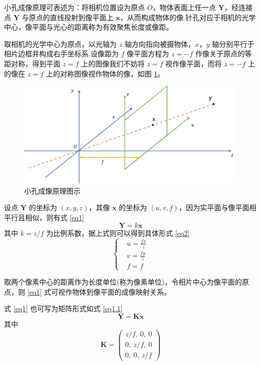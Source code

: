 \documentclass{article}
\numberwithin{equation}{section}						%
\numberwithin{figure}{section}							%
\begin{document}
\begin{sloppypar}
	小孔成像原理可表述为：将相机位置设为原点 $O$，物体表面上任一点 $\bm Y$，经连接点 $\bm Y$ 与原点的直线投射到像平面上 $\bm x$，从而构成物体的像.针孔对应于相机的光学中心，像平面与光心的距离称为有效聚焦长度或像距。
	
	取相机的光学中心为原点，以光轴为 $z$ 轴方向指向被摄物体，$x$，$y$ 轴分别平行于相片边框并构成右手坐标系.设像距为 $f$ 像平面方程为 $z=-f$ 作像关于原点的等距对称，得到平面 $z=f$ 上的图像我们不妨将 $z=f$ 视作像平面，而将 $z=-f$ 上的像在 $z=f$ 上的对称图像视作物体的像，如图 \ref{zuobiao}。
	\begin{figure}[H]
		\centering
		\includegraphics[width=0.8\linewidth]{zuobiao}
		\caption{小孔成像原理图示}
		\label{zuobiao}
	\end{figure}
	
	设点 $\bm Y$ 的坐标为 $(x,y,z)$，其像 $\bm x$ 的坐标为 $(u,v,f)$，因为实平面与像平面相平行且相似，则有式 \ref{eq1}
	\begin{equation}
		{\bm Y} = k{\bm x}
		\label{eq1}
	\end{equation}
	其中 $k = z/f$ 为比例系数，据上式则可以得到具体形式 \ref{eq2}
	\begin{equation}
		\left\lbrace
		\begin{aligned}
			&u = \frac{fx}{z} \\
			&v = \frac{fy}{z} \\
			&f = f
		\end{aligned}
		\right. 
		\label{eq2}
	\end{equation}
	
	取两个像素中心的距离作为长度单位(称为像素单位)，令相片中心为像平面的原点，则 \ref{eq1} 式可视作物体到像平面的成像映射关系。
	
	式 \ref{eq1} 也可写为矩阵形式如式 \ref{eq1.1}
	\begin{equation}
		{\bm Y} = {\bm K}{\bm x}
		\label{eq1.1}
	\end{equation}
	其中
	\begin{equation}
		{\bm K} = \left(
		\begin{aligned}
			z/f,\ 0,\ 0 \\
			0,\ z/f,\ 0 \\
			0,\ 0,\ z/f
		\end{aligned}
		\right) 
	\end{equation}

\end{sloppypar}
\end{document}
